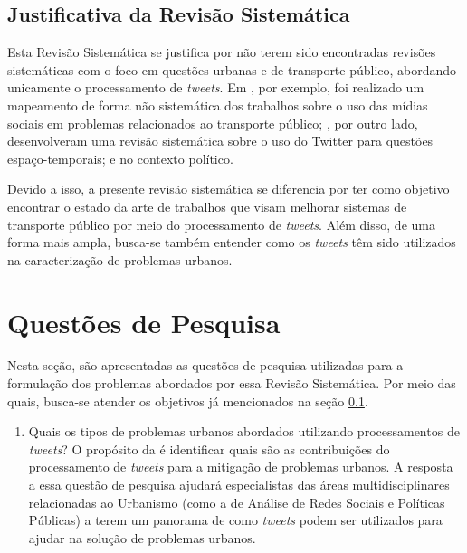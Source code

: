 \documentclass[
	12pt,				%
	oneside,			%
	a4paper,			%
	english,			%
	brazil				%
	]{abntex2ppgsi}
\begin{document}
{{\subsection{Justificativa da Revisão Sistemática}
\label{justificativa}
Esta Revisão Sistemática se justifica por não terem sido encontradas revisões sistemáticas com o foco em questões urbanas e de transporte público, abordando unicamente o processamento de \textit{tweets}. Em \cite{Chaniotakis2016}, por exemplo, foi realizado um mapeamento de forma não sistemática dos trabalhos sobre o uso das mídias sociais em problemas relacionados ao transporte público; \cite{steiger2015advanced}, por outro lado, desenvolveram uma revisão sistemática sobre o uso do Twitter para questões espaço-temporais; e \cite{jungherr2016twitter} no contexto político.%

Devido a isso, a presente revisão sistemática se diferencia por ter como objetivo encontrar o estado da arte de trabalhos que visam melhorar sistemas de transporte público por meio do processamento de \textit{tweets}. Além disso, de uma forma mais ampla, busca-se também entender como os \textit{tweets} têm sido utilizados na caracterização  de problemas urbanos.

\section{Questões de Pesquisa}
\label{questoes}
Nesta seção, são apresentadas as questões de pesquisa utilizadas para a formulação dos problemas abordados por essa Revisão Sistemática. Por meio das quais, busca-se atender os objetivos já mencionados na seção \ref{justificativa}.

\begin{enumerate}

\item Quais os tipos de problemas urbanos abordados utilizando processamentos de \textit{tweets}?
\label{item:1} \newline \newline
O propósito da  é identificar quais são as contribuições do processamento de \textit{tweets} para a mitigação de problemas urbanos. A resposta a essa questão de pesquisa ajudará especialistas das áreas multidisciplinares relacionadas ao Urbanismo (como a de Análise de Redes Sociais e Políticas Públicas) a terem um panorama de como \textit{tweets} podem ser utilizados para ajudar na solução de problemas urbanos. \newline


\end{enumerate}}}
\end{document}
